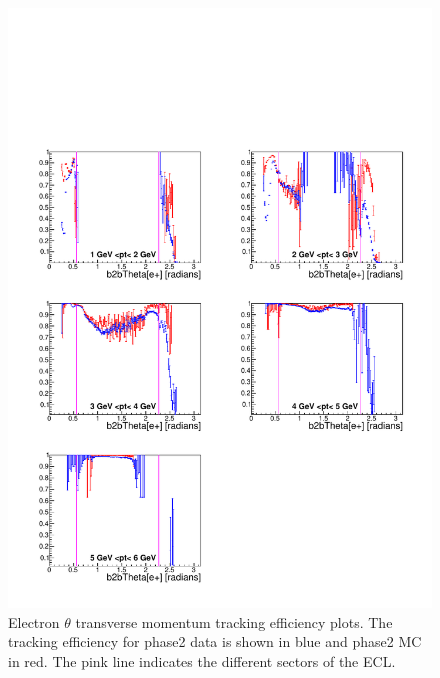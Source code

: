 \documentclass[a4paper,11pt,twosided,final,german,openbib,pdftex,listof=totoc,bibliography=totoc]{scrbook}
\begin{document}
\begin{figure}[!htbp]
	\centering
	\includegraphics[width=\textwidth]{Plots/master/xPtMThetaem}
	\caption[Transverse Momentum $\theta$ Electron Efficiency Phase2]{Electron $\theta$ transverse momentum tracking efficiency plots. The tracking efficiency for phase2 data is shown in blue and phase2 MC in red. The pink line indicates the different sectors of the ECL.}
	\label{plt:xPtMThetaem}
\end{figure}
\end{document}
